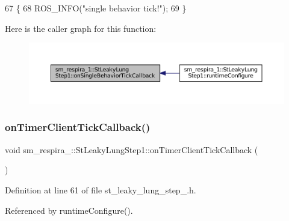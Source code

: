 \begin{DoxyCode}
67     \{
68         ROS\_INFO(\textcolor{stringliteral}{"single behavior tick!"});
69     \}
\end{DoxyCode}
Here is the caller graph for this function\+:
\nopagebreak
\begin{figure}[H]
\begin{center}
\leavevmode
\includegraphics[width=350pt]{structsm__respira__1_1_1StLeakyLungStep1_aa460e2eed62e5b958ee85ddc4904f776_icgraph}
\end{center}
\end{figure}
\mbox{\label{structsm__respira__1_1_1StLeakyLungStep1_a1b9954b4c7d47fe9423dd29391f5629b}} 
\subsubsection{\texorpdfstring{on\+Timer\+Client\+Tick\+Callback()}{onTimerClientTickCallback()}}
{\footnotesize\ttfamily void sm\+\_\+respira\+\_\+::\+St\+Leaky\+Lung\+Step1\+::on\+Timer\+Client\+Tick\+Callback (\begin{DoxyParamCaption}{ }\end{DoxyParamCaption})\hspace{0.3cm}{\ttfamily [inline]}}



Definition at line 61 of file st\+\_\+leaky\+\_\+lung\+\_\+step\+\_.\+h.



Referenced by runtime\+Configure().


